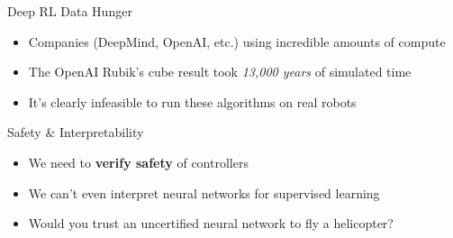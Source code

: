 \documentclass{beamer}
\begin{document}
\begin{frame}{Deep RL Data Hunger}
  \begin{itemize}
    \item Companies (DeepMind, OpenAI, etc.) using incredible amounts of compute
    \item The OpenAI Rubik's cube result took \emph{13,000 years} of simulated time
    \item It's clearly infeasible to run these algorithms on real robots
  \end{itemize}
\end{frame}

\begin{frame}{Safety \& Interpretability}
  \begin{itemize}
    \item We need to \textbf{verify safety} of controllers
    \item We can't even interpret neural networks for supervised learning
    \item Would you trust an uncertified neural network to fly a helicopter?
  \end{itemize}
\end{frame}
\end{document}
